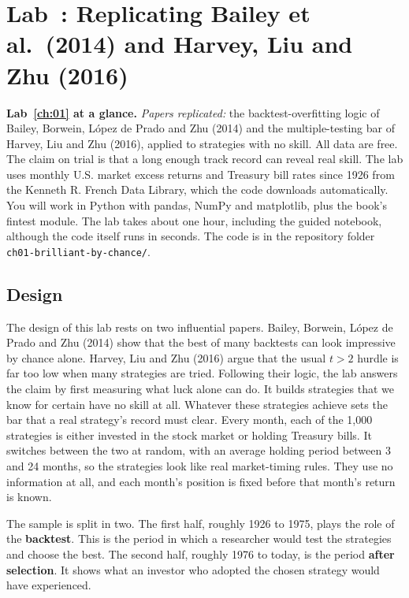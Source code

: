 \section{Lab~\thechapter: Replicating Bailey et al.\ (2014) and Harvey, Liu and Zhu (2016)}
\label{sec:01-lab}

\begin{callout}
\textbf{Lab~\ref{ch:01} at a glance.} \emph{Papers replicated:} the backtest-overfitting logic of Bailey, Borwein, L\'opez de Prado and Zhu (2014) and the multiple-testing bar of Harvey, Liu and Zhu (2016), applied to strategies with no skill. All data are free. The claim on trial is that a long enough track record can reveal real skill. The lab uses monthly U.S. market excess returns and Treasury bill rates since 1926 from the Kenneth R. French Data Library, which the code downloads automatically. You will work in Python with pandas, NumPy and matplotlib, plus the book's fintest module. The lab takes about one hour, including the guided notebook, although the code itself runs in seconds. The code is in the repository folder \texttt{ch01-brilliant-by-chance/}.
\end{callout}

\subsection*{Design}

The design of this lab rests on two influential papers. Bailey, Borwein, L\'opez de Prado and Zhu (2014) show that the best of many backtests can look impressive by chance alone. Harvey, Liu and Zhu (2016) argue that the usual $t > 2$ hurdle is far too low when many strategies are tried. Following their logic, the lab answers the claim by first measuring what luck alone can do. It builds strategies that we know for certain have no skill at all. Whatever these strategies achieve sets the bar that a real strategy's record must clear. Every month, each of the 1,000 strategies is either invested in the stock market or holding Treasury bills. It switches between the two at random, with an average holding period between 3 and 24 months, so the strategies look like real market-timing rules. They use no information at all, and each month's position is fixed before that month's return is known.

The sample is split in two. The first half, roughly 1926 to 1975, plays the role of the \textbf{backtest}. This is the period in which a researcher would test the strategies and choose the best. The second half, roughly 1976 to today, is the period \textbf{after selection}. It shows what an investor who adopted the chosen strategy would have experienced.

